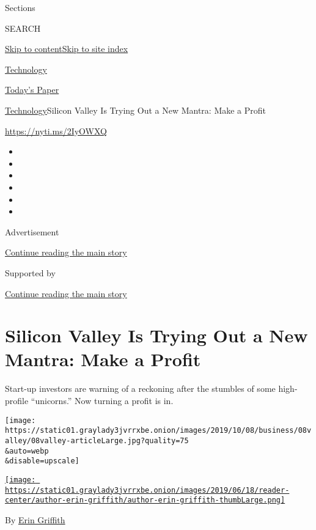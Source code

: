 Sections

SEARCH

\protect\hyperlink{site-content}{Skip to
content}\protect\hyperlink{site-index}{Skip to site index}

\href{https://www.nytimes3xbfgragh.onion/section/technology}{Technology}

\href{https://myaccount.nytimes3xbfgragh.onion/auth/login?response_type=cookie\&client_id=vi}{}

\href{https://www.nytimes3xbfgragh.onion/section/todayspaper}{Today's
Paper}

\href{/section/technology}{Technology}\textbar{}Silicon Valley Is Trying
Out a New Mantra: Make a Profit

\url{https://nyti.ms/2IyOWXQ}

\begin{itemize}
\item
\item
\item
\item
\item
\item
\end{itemize}

Advertisement

\protect\hyperlink{after-top}{Continue reading the main story}

Supported by

\protect\hyperlink{after-sponsor}{Continue reading the main story}

\hypertarget{silicon-valley-is-trying-out-a-new-mantra-make-a-profit}{%
\section{Silicon Valley Is Trying Out a New Mantra: Make a
Profit}\label{silicon-valley-is-trying-out-a-new-mantra-make-a-profit}}

Start-up investors are warning of a reckoning after the stumbles of some
high-profile ``unicorns.'' Now turning a profit is in.

\texttt{[image: https://static01.graylady3jvrrxbe.onion/images/2019/10/08/business/08valley/08valley-articleLarge.jpg?quality=75\\\&auto=webp\\\&disable=upscale]}

\href{https://www.nytimes3xbfgragh.onion/by/erin-griffith}{\texttt{[image: https://static01.graylady3jvrrxbe.onion/images/2019/06/18/reader-center/author-erin-griffith/author-erin-griffith-thumbLarge.png]}}

By \href{https://www.nytimes3xbfgragh.onion/by/erin-griffith}{Erin
Griffith}

